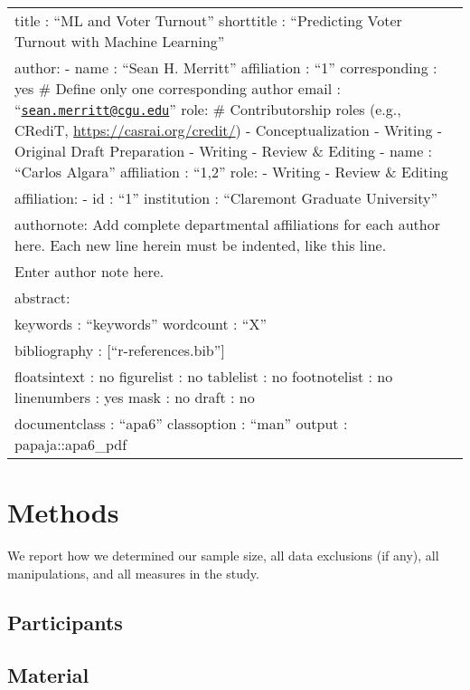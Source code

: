 \documentclass[
  english,
  man]{article}
\author{\phantom{0}}
\date{}
\affiliation{\phantom{0}}
\begin{document}
\begin{longtable}[]{@{}
  >{\raggedright\arraybackslash}p{}@{}}
\toprule
\endhead
title : ``ML and Voter Turnout''
shorttitle : ``Predicting Voter Turnout with Machine Learning'' \\
author:
- name : ``Sean H. Merritt''
affiliation : ``1''
corresponding : yes \# Define only one corresponding author
email : ``\href{mailto:sean.merritt@cgu.edu}{\nolinkurl{sean.merritt@cgu.edu}}''
role: \# Contributorship roles (e.g., CRediT, \url{https://casrai.org/credit/})
- Conceptualization
- Writing - Original Draft Preparation
- Writing - Review \& Editing
- name : ``Carlos Algara''
affiliation : ``1,2''
role:
- Writing - Review \& Editing \\
affiliation:
- id : ``1''
institution : ``Claremont Graduate University'' \\
authornote: \textbar{}
Add complete departmental affiliations for each author here. Each new line herein must be indented, like this line. \\
Enter author note here. \\
abstract: \textbar{} \\
keywords : ``keywords''
wordcount : ``X'' \\
bibliography : {[}``r-references.bib''{]} \\
floatsintext : no
figurelist : no
tablelist : no
footnotelist : no
linenumbers : yes
mask : no
draft : no \\
documentclass : ``apa6''
classoption : ``man''
output : papaja::apa6\_pdf \\
\bottomrule
\end{longtable}

\hypertarget{methods}{%
\section{Methods}\label{methods}}

We report how we determined our sample size, all data exclusions (if any), all manipulations, and all measures in the study.

\hypertarget{participants}{%
\subsection{Participants}\label{participants}}

\hypertarget{material}{%
\subsection{Material}\label{material}}
\end{document}
